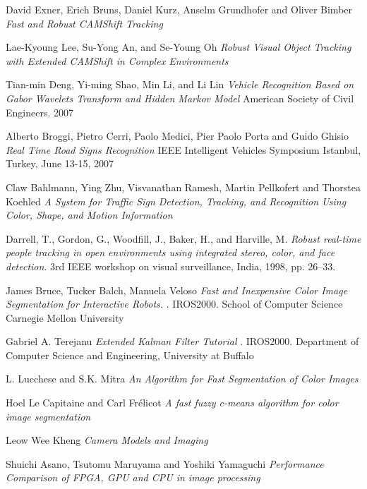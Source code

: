 \documentclass[11pt, oneside]{book} %
\begin{document}
\begin{thebibliography}{9}
 David Exner, Erich Bruns, Daniel Kurz, Anselm Grundhofer and Oliver Bimber  \textit{Fast and Robust CAMShift Tracking}

 Lae-Kyoung Lee, Su-Yong An, and Se-Young Oh  \textit{ Robust Visual Object Tracking with Extended CAMShift in Complex Environments}
 
 Tian-min Deng, Yi-ming Shao, Min Li, and Li Lin \textit{Vehicle Recognition Based on Gabor Wavelets Transform and Hidden Markov Model} American Society of Civil Engineers. 2007
 
 Alberto Broggi, Pietro Cerri, Paolo Medici, Pier Paolo Porta and Guido Ghisio  \textit{Real Time Road Signs Recognition} IEEE Intelligent Vehicles Symposium Istanbul, Turkey, June 13-15, 2007

 Claw Bahlmann, Ying Zhu, Visvanathan Ramesh, Martin Pellkofert and Thorstea Koehled  \textit{A System for Traffic Sign Detection, Tracking, and 	Recognition Using Color, Shape, and Motion Information}

 Darrell, T., Gordon, G., Woodﬁll, J., Baker, H., and Harville, M. \textit{Robust real-time people tracking in open environments using integrated stereo, color, and face detection}. 3rd IEEE workshop on visual surveillance, India, 1998, pp. 26–33.

 James Bruce, Tucker Balch, Manuela Veloso  \textit{Fast and Inexpensive Color Image Segmentation for Interactive Robots.} . IROS2000. School of Computer Science Carnegie Mellon University

 Gabriel A. Terejanu \textit{Extended Kalman Filter Tutorial} . IROS2000. Department of Computer Science and Engineering, University at Buffalo

 L. Lucchese and S.K. Mitra \textit{An Algorithm for Fast Segmentation of Color Images}

 Hoel Le Capitaine and Carl Frélicot \textit{A fast fuzzy c-means algorithm for color image segmentation}

  Leow Wee Kheng \textit{Camera Models and Imaging}

 Shuichi Asano, Tsutomu Maruyama and Yoshiki Yamaguchi \textit{Performance Comparison of FPGA, GPU and CPU in image processing}


\end{thebibliography}
\end{document}

